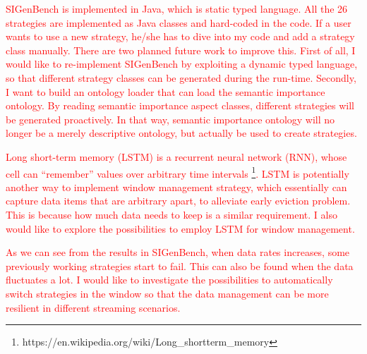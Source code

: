 \textcolor{red}{
SIGenBench is implemented in Java, which is static typed language.
All the 26 strategies are implemented as Java classes and hard-coded in the code. 
If a user wants to use a new strategy, he/she has to dive into my code and add a strategy class manually. 
There are two planned future work to improve this. 
First of all, I would like to re-implement SIGenBench by exploiting a dynamic typed language, so that different strategy classes can be generated during the run-time. 
Secondly, I want to build an ontology loader that can load the semantic importance ontology.
By reading semantic importance aspect classes, different strategies will be generated proactively. 
In that way, semantic importance ontology will no longer be a merely descriptive ontology, but actually be used to create strategies.
}

\textcolor{red}{
Long short-term memory (LSTM) \cite{DBLP:journals/neco/HochreiterS97} is a recurrent neural network (RNN), whose cell can ``remember'' values over arbitrary time intervals \footnote{https://en.wikipedia.org/wiki/Long\_short\-term\_memory}.
LSTM is potentially another way to implement window management strategy, which essentially can capture data items that are arbitrary apart, to alleviate early eviction problem. 
This is because how much data needs to keep is a similar requirement. 
I also would like to explore the possibilities to employ LSTM for window management. 
}

\textcolor{red}{
As we can see from the results in SIGenBench, when data rates increases, some previously working strategies start to fail.
This can also be found when the data fluctuates a lot.
I would like to investigate the possibilities to automatically switch strategies in the window so that the data management can be more resilient in different streaming scenarios. 
}
%
